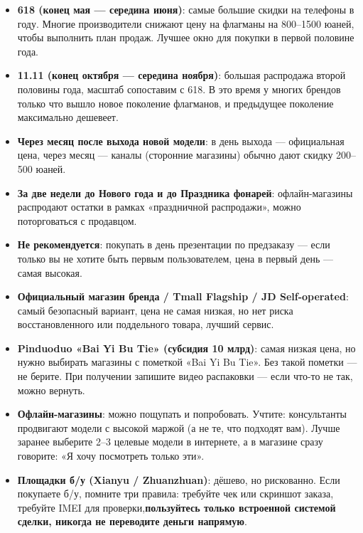 \begin{itemize}
  \item \textbf{618 (конец мая — середина июня)}: самые большие скидки на телефоны в году. Многие производители снижают цену на флагманы на 800–1500 юаней, чтобы выполнить план продаж. Лучшее окно для покупки в первой половине года.
  \item \textbf{11.11 (конец октября — середина ноября)}: большая распродажа второй половины года, масштаб сопоставим с 618. В это время у многих брендов только что вышло новое поколение флагманов, и предыдущее поколение максимально дешевеет.
  \item \textbf{Через месяц после выхода новой модели}: в день выхода — официальная цена, через месяц — каналы (сторонние магазины) обычно дают скидку 200–500 юаней.
  \item \textbf{За две недели до Нового года и до Праздника фонарей}: офлайн-магазины распродают остатки в рамках «праздничной распродажи», можно поторговаться с продавцом.
  \item \textbf{Не рекомендуется}: покупать в день презентации по предзаказу — если только вы не хотите быть первым пользователем, цена в первый день — самая высокая.
\end{itemize}


\begin{itemize}
  \item \textbf{Официальный магазин бренда / Tmall Flagship / JD Self-operated}: самый безопасный вариант, цена не самая низкая, но нет риска восстановленного или поддельного товара, лучший сервис.
  \item \textbf{Pinduoduo «Bai Yi Bu Tie» (субсидия 10 млрд)}: самая низкая цена, но нужно выбирать магазины с пометкой «Bai Yi Bu Tie». Без такой пометки — не берите. При получении запишите видео распаковки — если что-то не так, можно вернуть.
  \item \textbf{Офлайн-магазины}: можно пощупать и попробовать. Учтите: консультанты продвигают модели с высокой маржой (а не те, что подходят вам). Лучше заранее выберите 2–3 целевые модели в интернете, а в магазине сразу говорите: «Я хочу посмотреть только эти».
  \item \textbf{Площадки б/у (Xianyu / Zhuanzhuan)}: дёшево, но рискованно. Если покупаете б/у, помните три правила: требуйте чек или скриншот заказа, требуйте IMEI для проверки,\textbf{пользуйтесь только встроенной системой сделки, никогда не переводите деньги напрямую}.
\end{itemize}

